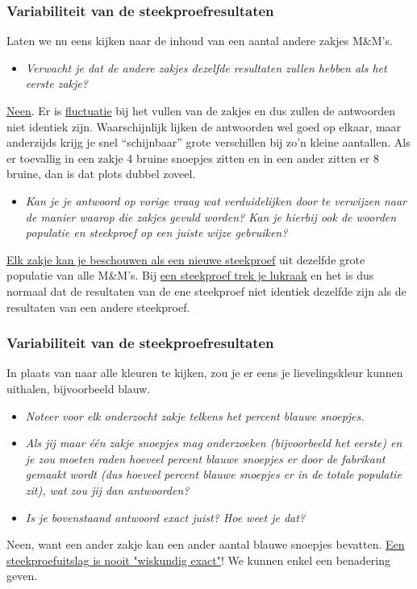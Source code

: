 \documentclass[dutch]{beamer}
\newcommand{\vraag}[1]{\begin{itemize}\item {\it #1}\end{itemize}}
\begin{document}
\begin{frame}
\frametitle{Variabiliteit van de steekproefresultaten}
Laten we nu eens kijken naar de inhoud van een aantal andere zakjes M\&M's.\\
\pause
\vraag{Verwacht je dat de andere zakjes dezelfde resultaten zullen hebben als het eerste zakje?}
\pause
\uline{Neen}. Er is \uline{fluctuatie} bij het vullen van de zakjes en dus zullen de antwoorden niet identiek
zijn. Waarschijnlijk lijken de antwoorden wel goed op elkaar, maar anderzijds krijg je snel
“schijnbaar” grote verschillen bij zo’n kleine aantallen. Als er toevallig in een zakje 4
bruine snoepjes zitten en in een ander zitten er 8 bruine, dan is dat plots dubbel zoveel.
\pause
\vraag{Kan je je antwoord op vorige vraag wat verduidelijken door te verwijzen naar de manier
waarop die zakjes gevuld worden? Kan je hierbij ook de woorden populatie en steekproef op
een juiste wijze gebruiken?}
\pause
\uline{Elk zakje kan je beschouwen als een nieuwe steekproef} uit dezelfde grote populatie van alle
M\&M’s. Bij \uline{een steekproef trek je lukraak} en het is dus normaal dat de resultaten van de ene
steekproef niet identiek dezelfde zijn als de resultaten van een andere steekproef.
\end{frame}

\begin{frame}
\frametitle{Variabiliteit van de steekproefresultaten}
In plaats van naar alle kleuren te kijken, zou je er eens je lievelingskleur kunnen uithalen,
bijvoorbeeld blauw.\\
\pause
\vraag{Noteer voor elk onderzocht zakje telkens het percent blauwe snoepjes.}
\vspace*{1cm}
\pause
\vraag{Als jij maar één zakje snoepjes mag onderzoeken (bijvoorbeeld het eerste) en je zou moeten raden hoeveel
percent blauwe snoepjes er door de fabrikant gemaakt wordt (dus hoeveel percent blauwe
snoepjes er in de totale populatie zit), wat zou jij dan antwoorden?}
\vspace*{1cm}
\pause
\vraag{Is je bovenstaand antwoord exact juist? Hoe weet je dat?}
\pause
Neen, want een ander zakje kan een ander aantal blauwe snoepjes bevatten. \uline{Een steekproefuitslag is nooit "wiskundig exact"}! We kunnen enkel een benadering geven.
\end{frame}
\end{document}
